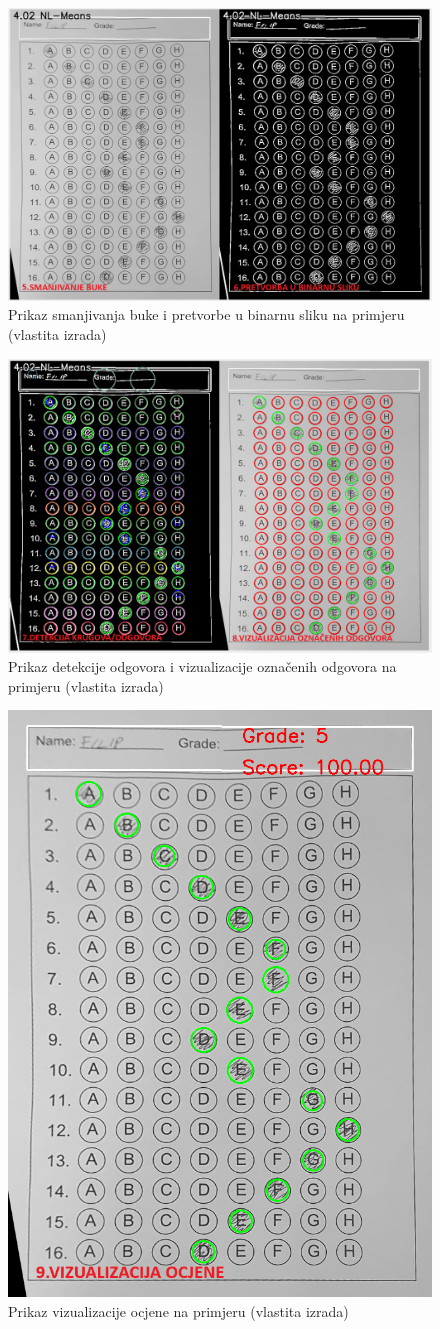 \documentclass{foi}
\begin{document}
\begin{figure}[H]
\centering
\includegraphics[width=0.85\linewidth]{slike/null (9).png}
\caption{Prikaz smanjivanja buke i pretvorbe u binarnu sliku na primjeru (vlastita izrada)}
\end{figure}

\begin{figure}[H]
\centering
\includegraphics[width=0.8\linewidth]{slike/null (10).png}
\caption{Prikaz detekcije odgovora i vizualizacije označenih odgovora na primjeru (vlastita izrada)}
\end{figure}

\begin{figure}[H]
\centering
\includegraphics[width=0.55\linewidth]{slike/08_VisualizeGrade.png}
\caption{Prikaz vizualizacije ocjene na primjeru (vlastita izrada)}
\end{figure}
\end{document}
